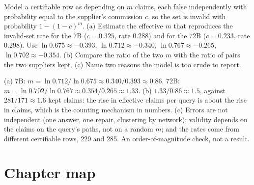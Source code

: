 \begin{exercicio}[metodo=estimation,conceito=escala-validade]
Model a certifiable row as depending on $m$ claims, each false independently with probability equal to
the supplier's commission $c$, so the set is invalid with probability $1 - (1-c)^m$. (a) Estimate the
effective $m$ that reproduces the invalid-set rate for the 7B ($c = 0.325$, rate 0.288) and for the 72B
($c = 0.233$, rate 0.298). Use $\ln 0.675 \approx -0.393$, $\ln 0.712 \approx -0.340$,
$\ln 0.767 \approx -0.265$, $\ln 0.702 \approx -0.354$. (b) Compare the ratio of the two $m$ with the
ratio of pairs the two suppliers kept. (c) Name two reasons the model is too crude to report.
\end{exercicio}
\begin{solucao}
(a) 7B: $m = \ln 0.712 / \ln 0.675 \approx 0.340/0.393 \approx 0.86$. 72B: $m = \ln 0.702 / \ln 0.767
\approx 0.354/0.265 \approx 1.33$. (b) $1.33/0.86 \approx 1.5$, against $281/171 \approx 1.6$ kept
claims: the rise in effective claims per query is about the rise in claims, which is the counting
mechanism in numbers. (c) Errors are not independent (one answer, one repair, clustering by network); validity
depends on the claims on the query's paths, not on a random $m$; and the rates come from different
certifiable rows, 229 and 285. An order-of-magnitude check, not a result.
\end{solucao}

\section*{Chapter map}

\begin{center}
\end{center}
